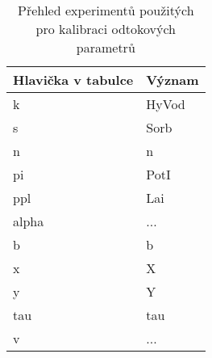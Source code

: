 \begin{table}%
  \centering
  \caption{Přehled experimentů použitých pro kalibraci odtokových parametrů}
  {\small
    \begin{tabular}{p{1.5cm}p{4cm}}
    \hline
    Hlavička v tabulce & Význam\\
    \hline \hline
    k  & \acl{HyVod} \\
    s  & \acl{Sorb} \\
    n & \acl{n}\\
    pi & \acl{PotI}\\
    ppl& \acl{Lai} \\
    alpha & ... \\
    b  & \acl{b} \\
    x  & \acl{X} \\
    y  & \acl{Y} \\
    tau  & \acl{tau} \\
    v  & ... \\
    \hline
    \end{tabular}%
  }
  \label{tab:soilveg}%
\end{table}%